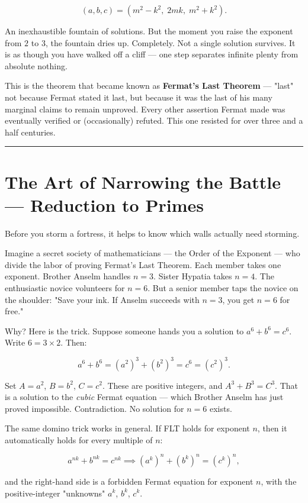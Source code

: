 \documentclass[12pt, letterpaper, openany]{book}
\theoremstyle{definition}
\theoremstyle{remark}
\begin{document}
\[
(a, b, c) = (m^2 - k^2,\; 2mk,\; m^2 + k^2).
\]

An inexhaustible fountain of solutions. But the moment you raise the exponent from $2$ to $3$, the fountain dries up. Completely. Not a single solution survives. It is as though you have walked off a cliff --- one step separates infinite plenty from absolute nothing.

This is the theorem that became known as \textbf{Fermat's Last Theorem} --- "last" not because Fermat stated it last, but because it was the last of his many marginal claims to remain unproved. Every other assertion Fermat made was eventually verified or (occasionally) refuted. This one resisted for over three and a half centuries.


\bigskip\noindent\rule{\textwidth}{0.4pt}\bigskip



\section*{The Art of Narrowing the Battle --- Reduction to Primes}


Before you storm a fortress, it helps to know which walls actually need storming.

Imagine a secret society of mathematicians --- the Order of the Exponent --- who divide the labor of proving Fermat's Last Theorem. Each member takes one exponent. Brother Anselm handles $n = 3$. Sister Hypatia takes $n = 4$. The enthusiastic novice volunteers for $n = 6$. But a senior member taps the novice on the shoulder: "Save your ink. If Anselm succeeds with $n = 3$, you get $n = 6$ for free."

Why? Here is the trick. Suppose someone hands you a solution to $a^6 + b^6 = c^6$. Write $6 = 3 \times 2$. Then:

\[
a^6 + b^6 = (a^2)^3 + (b^2)^3 = c^6 = (c^2)^3.
\]

Set $A = a^2$, $B = b^2$, $C = c^2$. These are positive integers, and $A^3 + B^3 = C^3$. That is a solution to the \textit{cubic} Fermat equation --- which Brother Anselm has just proved impossible. Contradiction. No solution for $n = 6$ exists.

The same domino trick works in general. If FLT holds for exponent $n$, then it automatically holds for every multiple of $n$:

\[
a^{nk} + b^{nk} = c^{nk} \implies (a^k)^n + (b^k)^n = (c^k)^n,
\]

and the right-hand side is a forbidden Fermat equation for exponent $n$, with the positive-integer "unknowns" $a^k$, $b^k$, $c^k$.
\end{document}
